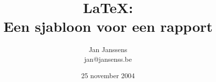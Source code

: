 \documentclass[a4paper,11pt]{report}
\begin{document}

\title{LaTeX:\\Een sjabloon voor een rapport}
\author{Jan Janssens\\jan@jansenss.be}
\date{25 november 2004}
\maketitle

\tableofcontents








\appendix

\end{document}
